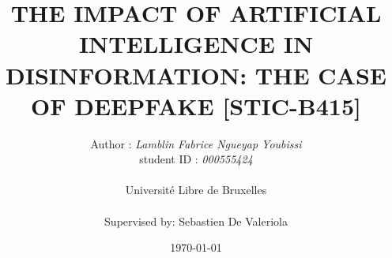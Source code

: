 \title{\textbf{ THE IMPACT OF ARTIFICIAL INTELLIGENCE IN DISINFORMATION:} \textbf{ THE CASE OF DEEPFAKE [STIC-B415]}}

\author{Author : \emph{Lamblin Fabrice Ngueyap Youbissi} \\  student ID : \emph{000555424}
\\ \\ Université Libre de Bruxelles \\ \\ Supervised by: Sebastien De Valeriola }
\date{\today}



\maketitle